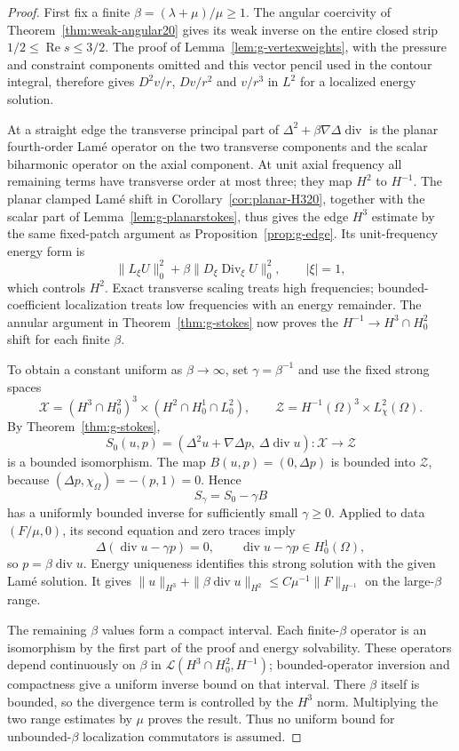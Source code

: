 \documentclass[11pt,a4paper]{article}
\theoremstyle{remark}
\numberwithin{equation}{section}
\begin{document}
\begin{proof}
First fix a finite $\beta=(\lambda+\mu)/\mu\ge1$. The angular
coercivity of Theorem~\ref{thm:weak-angular20} gives its weak inverse on the entire
closed strip $1/2\le\operatorname{Re}s\le3/2$. The proof of
Lemma~\ref{lem:g-vertexweights}, with the pressure and constraint components
omitted and this vector pencil used in the contour integral, therefore gives
$D^2v/r$, $Dv/r^2$ and $v/r^3$ in $L^2$ for a localized energy solution.

At a straight edge the transverse principal part of
$\Delta^2+\beta\nabla\Delta\operatorname{div}$ is the planar fourth-order
Lam\'e operator on the two transverse components and the scalar biharmonic
operator on the axial component. At unit axial frequency all remaining terms
have transverse order at most three; they map $H^2$ to $H^{-1}$. The planar
clamped Lam\'e shift in Corollary~\ref{cor:planar-H320}, together with the scalar part of
Lemma~\ref{lem:g-planarstokes}, thus gives the edge $H^3$ estimate by the
same fixed-patch argument as Proposition~\ref{prop:g-edge}. Its unit-frequency
energy form is
\[
 \|L_\xi U\|_0^2+\beta\|D_\xi\operatorname{Div}_\xi U\|_0^2,
 \qquad |\xi|=1,
\]
which controls $H^2$. Exact transverse scaling treats high frequencies;
bounded-coefficient localization treats low frequencies with an energy
remainder. The annular argument in Theorem~\ref{thm:g-stokes} now proves
the $H^{-1}\to H^3\cap H^2_0$ shift for each finite $\beta$.

To obtain a constant uniform as $\beta\to\infty$, set $\gamma=\beta^{-1}$
and use the fixed strong spaces
\[
 \mathcal X=(H^3\cap H^2_0)^3\times(H^2\cap H^1_0\cap L^2_0),\qquad
 \mathcal Z=H^{-1}(\Omega)^3\times L^2_\chi(\Omega).
\]
By Theorem~\ref{thm:g-stokes},
\[
 S_0(u,p)=(\Delta^2u+\nabla\Delta p,\ \Delta\operatorname{div}u)
 :\mathcal X\longrightarrow\mathcal Z
\]
is a bounded isomorphism. The map $B(u,p)=(0,\Delta p)$ is bounded into
$\mathcal Z$, because
$(\Delta p,\chi_\Omega)=-(p,1)=0$. Hence
\begin{equation}\label{eq:g-strong-space-perturbation}
 S_\gamma=S_0-\gamma B
\end{equation}
has a uniformly bounded inverse for sufficiently small $\gamma\ge0$. Applied to data $(F/\mu,0)$, its second equation and
zero traces imply
\[
 \Delta(\operatorname{div}u-\gamma p)=0,
 \qquad \operatorname{div}u-\gamma p\in H^1_0(\Omega),
\]
so $p=\beta\operatorname{div}u$. Energy uniqueness identifies this strong
solution with the given Lam\'e solution. It gives
$\|u\|_{H^3}+\|\beta\operatorname{div}u\|_{H^2}
\le C\mu^{-1}\|F\|_{H^{-1}}$ on the large-$\beta$ range.

The remaining $\beta$ values form a compact interval. Each finite-$\beta$
operator is an isomorphism by the first part of the proof and energy
solvability. These operators depend continuously on $\beta$ in
$\mathcal L(H^3\cap H^2_0,H^{-1})$; bounded-operator inversion and compactness
give a uniform inverse bound on that interval. There $\beta$ itself is bounded,
so the divergence term is controlled by the $H^3$ norm. Multiplying the two
range estimates by $\mu$ proves the result. Thus no uniform bound for
unbounded-$\beta$ localization commutators is assumed.
\end{proof}
\end{document}
